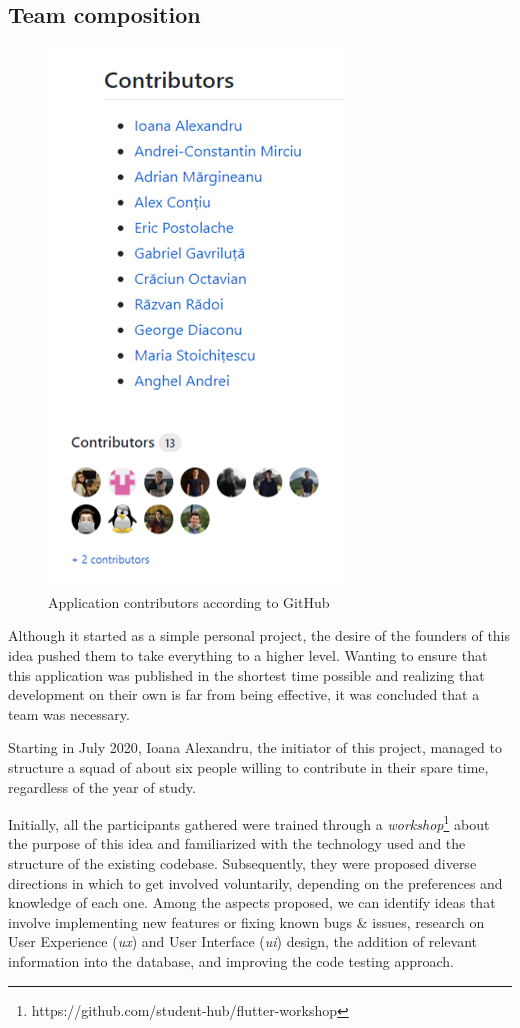 \subsection{Team composition} \label{1:team_composition}

    \begin{figure}
            \centering
            \includegraphics[width=0.42\columnwidth]{figures/contributors.png}
            \captionsetup{labelsep=space, textformat=empty}
            \caption{Application contributors according to GitHub}
            \label{2:fig:contributors}
    \end{figure}

    Although it started as a simple personal project, the desire of the founders of this idea pushed them to take everything to a higher level. Wanting to ensure that this application was published in the shortest time possible and realizing that development on their own is far from being effective, it was concluded that a team was necessary.
    
    Starting in July 2020, Ioana Alexandru, the initiator of this project, managed to structure a squad of about six people willing to contribute in their spare time, regardless of the year of study.
    
    Initially, all the participants gathered were trained through a \textit{workshop}\footnote{https://github.com/student-hub/flutter-workshop} about the purpose of this idea and familiarized with the technology used and the structure of the existing codebase. Subsequently, they were proposed diverse directions in which to get involved voluntarily, depending on the preferences and knowledge of each one. Among the aspects proposed, we can identify ideas that involve implementing new features or fixing known bugs \& issues, research on User Experience (\textit{\acrshort{ux}}) and User Interface (\textit{\acrshort{ui}}) design, the addition of relevant information into the database, and improving the code testing approach.
    
